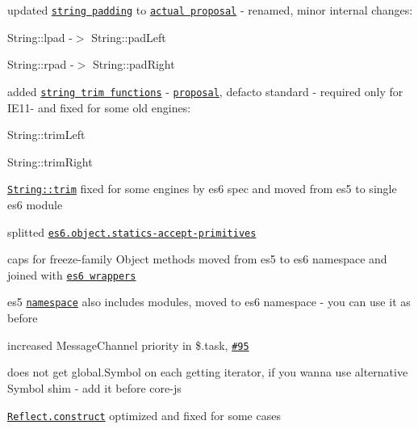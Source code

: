 \begin{DoxyItemize}
\item updated \href{https://github.com/zloirock/core-js/#ecmascript-7}{\tt string padding} to \href{https://github.com/ljharb/proposal-string-pad-left-right}{\tt actual proposal} -\/ renamed, minor internal changes\+:
\begin{DoxyItemize}
\item {\ttfamily String\+::lpad} -\/$>$ {\ttfamily String\+::pad\+Left}
\item {\ttfamily String\+::rpad} -\/$>$ {\ttfamily String\+::pad\+Right}
\end{DoxyItemize}
\item added \href{#ecmascript-7}{\tt string trim functions} -\/ \href{https://github.com/sebmarkbage/ecmascript-string-left-right-trim}{\tt proposal}, defacto standard -\/ required only for I\+E11-\/ and fixed for some old engines\+:
\begin{DoxyItemize}
\item {\ttfamily String\+::trim\+Left}
\item {\ttfamily String\+::trim\+Right}
\end{DoxyItemize}
\item \href{https://github.com/zloirock/core-js/#ecmascript-6-string}{\tt {\ttfamily String\+::trim}} fixed for some engines by es6 spec and moved from {\ttfamily es5} to single {\ttfamily es6} module
\item splitted \href{https://github.com/zloirock/core-js/#ecmascript-6-object}{\tt {\ttfamily es6.\+object.\+statics-\/accept-\/primitives}}
\item caps for {\ttfamily freeze}-\/family {\ttfamily Object} methods moved from {\ttfamily es5} to {\ttfamily es6} namespace and joined with \href{https://github.com/zloirock/core-js/#ecmascript-6-object}{\tt es6 wrappers}
\item {\ttfamily es5} \href{https://github.com/zloirock/core-js/#commonjs}{\tt namespace} also includes modules, moved to {\ttfamily es6} namespace -\/ you can use it as before
\item increased {\ttfamily Message\+Channel} priority in {\ttfamily \$.task}, \href{https://github.com/zloirock/core-js/issues/95}{\tt \#95}
\item does not get {\ttfamily global.\+Symbol} on each getting iterator, if you wanna use alternative {\ttfamily Symbol} shim -\/ add it before {\ttfamily core-\/js}
\item \href{https://github.com/zloirock/core-js/#ecmascript-6-reflect}{\tt {\ttfamily Reflect.\+construct}} optimized and fixed for some cases

\end{DoxyItemize}
